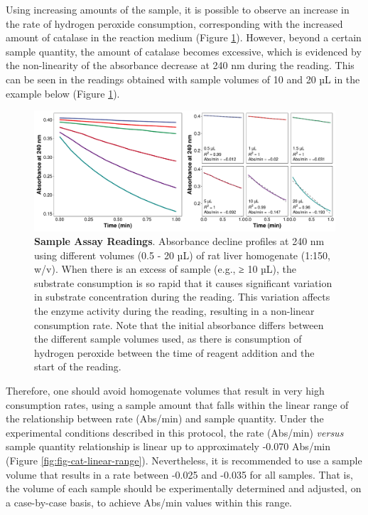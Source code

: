 \documentclass[
  9pt,
  american,
  a5paper,
  extrafontsizes,onecolumn,openright
  ]{memoir}
\begin{document}
\normalsize

Using increasing amounts of the sample, it is possible to observe an increase in the rate of hydrogen peroxide consumption, corresponding with the increased amount of catalase in the reaction medium (Figure \ref{fig:fig-cat-smp-vol-curves}). However, beyond a certain sample quantity, the amount of catalase becomes excessive, which is evidenced by the non-linearity of the absorbance decrease at 240 nm during the reading. This can be seen in the readings obtained with sample volumes of 10 and 20 µL in the example below (Figure \ref{fig:fig-cat-smp-vol-curves}).



\scriptsize

\begin{figure}

{\centering \includegraphics[width=1\linewidth]{Volume-1_files/figure-latex/fig-cat-smp-vol-curves-1} 

}

\caption{\textbf{Sample Assay Readings}. Absorbance decline profiles at 240 nm using different volumes (0.5 - 20 µL) of rat liver homogenate (1:150, w/v). When there is an excess of sample (e.g., ≥ 10 µL), the substrate consumption is so rapid that it causes significant variation in substrate concentration during the reading. This variation affects the enzyme activity during the reading, resulting in a non-linear consumption rate. Note that the initial absorbance differs between the different sample volumes used, as there is consumption of hydrogen peroxide between the time of reagent addition and the start of the reading.}\label{fig:fig-cat-smp-vol-curves}
\end{figure}

\normalsize

Therefore, one should avoid homogenate volumes that result in very high consumption rates, using a sample amount that falls within the linear range of the relationship between rate (Abs/min) and sample quantity. Under the experimental conditions described in this protocol, the rate (Abs/min) \emph{versus} sample quantity relationship is linear up to approximately -0.070 Abs/min (Figure \ref{fig:fig-cat-linear-range}). Nevertheless, it is recommended to use a sample volume that results in a rate between -0.025 and -0.035 for all samples. That is, the volume of each sample should be experimentally determined and adjusted, on a case-by-case basis, to achieve Abs/min values within this range.
\end{document}
